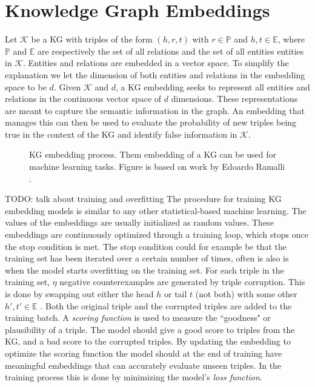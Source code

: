 \section{Knowledge Graph Embeddings}
\label{KG_embeddings}
Let $\mathcal{K}$ be a KG with triples of the form $(h, r, t)$ with $r\in \mathbb{P}$ and $h, t \in \mathbb{E}$, where $\mathbb{P}$ and $\mathbb{E}$ are respectively the set of all relations and the set of all entities entities in $\mathcal{K}$. Entities and relations are embedded in a vector space. To simplify the explanation we let the dimension of both entities and relations in the embedding space to be $d$.
Given $\mathcal{K}$ and $d$, a KG embedding seeks to represent all entities and relations in the continuous vector space of $d$ dimensions. These representations are meant to capture the semantic information in the graph. An embedding that manages this can then be used to evaluate the probability of new triples being true in the context of the KG and identify false information in $\mathcal{K}$.%

\begin{figure}[htp]
    \centering
    
    \caption[KG embedding process.]{KG embedding process. Them embedding of a KG can be used for machine learning tasks. Figure is based on work by Edoardo Ramalli \cite{wiki_KG_embedding}.}
    \label{KG_embdding_diag}
\end{figure}

TODO: talk about training and overfitting \newline
The procedure for training KG embedding models is similar to any other statistical-based machine learning. The values of the embeddings are usually initialized as random values. These embeddings are continuously optimized through a training loop, which stops once the stop condition is met. The stop condition could for example be that the training set has been iterated over a certain number of times, often is also is when the model starts overfitting on the training set. For each triple in the training set, $\eta$ negative counterexamples are generated by triple corruption. This is done by swapping out either the head $h$ or tail $t$ (not both) with some other $h', t' \in \mathbb{E}$ \cite{TransE}. Both the original triple and the corrupted triples are added to the training batch. A \textit{scoring function} is used to measure the ``goodness" or plausibility of a triple. The model should give a good score to triples from the KG, and a bad score to the corrupted triples. By updating the embedding to optimize the scoring function the model should at the end of training have meaningful embeddings that can accurately evaluate unseen triples. In the training process this is done by minimizing the model's \textit{loss function}.

